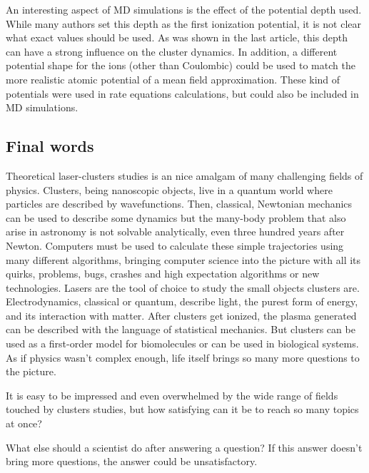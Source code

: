 An interesting aspect of MD simulations is the effect of the potential depth
used. While many authors set this depth as the first ionization potential, it
is not clear what exact values should be used. As was shown in the last article,
this depth can have a strong influence on the cluster dynamics. In addition, a
different potential shape for the ions (other than Coulombic) could be used to
match the more realistic atomic potential of a mean field approximation. These
kind of potentials were used in rate equations calculations, but could also be
included in MD simulations.


\subsection{Final words}
Theoretical laser-clusters studies is an nice amalgam of many challenging
fields of physics. Clusters, being nanoscopic objects, live in a quantum world
where particles are described by wavefunctions. Then, classical, Newtonian
mechanics can be used to describe some dynamics but the many-body problem that
also arise in astronomy is not solvable analytically, even three hundred years
after Newton. Computers must be used to calculate these simple trajectories
using many different algorithms, bringing computer science into the picture
with all its quirks, problems, bugs, crashes and high expectation algorithms or
new technologies. Lasers are the tool of choice to study the small objects
clusters are. Electrodynamics, classical or quantum, describe light, the purest
form of energy, and its interaction with matter. After clusters get ionized,
the plasma generated can be described with the language of statistical mechanics.
But clusters can be used as a first-order model for biomolecules or can be used
in biological systems. As if physics wasn't complex enough, life itself brings
so many more questions to the picture.

It is easy to be impressed and even overwhelmed by the wide range of fields
touched by clusters studies, but how satisfying can it be to reach so many
topics at once?

What else should a scientist do
after answering a question? If this answer doesn't bring more questions, the
answer could be unsatisfactory.
